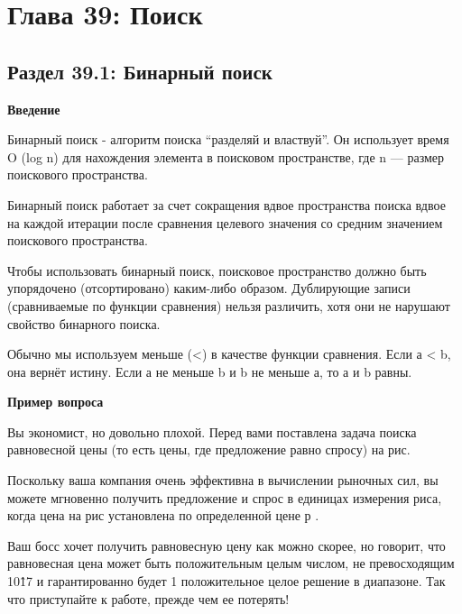 
\chapter*{Глава 39: Поиск}
\section*{Раздел 39.1: Бинарный поиск}

\vspace{\baselineskip}
\textbf{Введение}

\vspace{\baselineskip}
Бинарный поиск - алгоритм поиска “разделяй и властвуй”. Он использует время O (log n) для нахождения элемента в поисковом пространстве, где n ---  размер поискового пространства. 

\vspace{\baselineskip}
Бинарный поиск работает за счет сокращения вдвое пространства поиска вдвое на каждой итерации после сравнения целевого значения со средним значением поискового пространства.

\vspace{\baselineskip}
Чтобы использовать бинарный поиск, поисковое пространство должно быть упорядочено (отсортировано) каким-либо образом. Дублирующие записи (сравниваемые по функции сравнения) нельзя различить, хотя они не нарушают свойство бинарного	 поиска.

\vspace{\baselineskip}
Обычно мы используем меньше (<) в качестве функции сравнения. Если а < b, она вернёт истину. Если а не меньше b и b не меньше а, то а и b равны.

\vspace{\baselineskip}
\textbf{Пример вопроса}
\vspace{\baselineskip}

Вы экономист, но довольно плохой. Перед вами поставлена задача поиска равновесной цены (то есть цены, где предложение равно спросу) на рис. 


Поскольку ваша компания очень эффективна в вычислении рыночных сил, вы можете мгновенно получить предложение и спрос в единицах измерения риса, когда цена на рис установлена по определенной цене р . 

Ваш босс хочет получить равновесную цену как можно скорее, но говорит, что равновесная цена может быть положительным целым числом, не превосходящим 10\^17 и гарантированно будет 1 положительное целое решение в диапазоне. Так что приступайте к работе, прежде чем ее потерять! 

